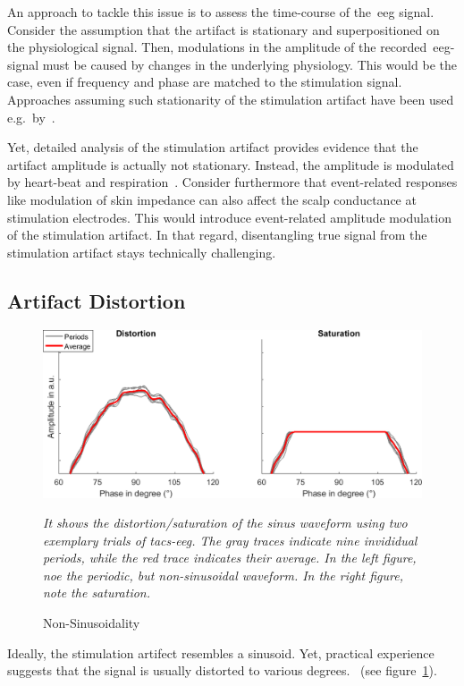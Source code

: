 \documentclass[a4paper]{article}
\newcommand{\figleg}[1]{\centering\itshape{#1}\/}
\newcommand{\figref}[1]{ (see figure~\ref{#1})}
\begin{document}
An approach to tackle this issue is to assess the time-course of the~\gls{eeg} signal. Consider the assumption that the artifact is stationary and superpositioned on the physiological signal. Then, modulations in the amplitude of the recorded~\gls{eeg}-signal must be caused by changes in the underlying physiology.
This would be the case, even if frequency and phase are matched to the stimulation signal. Approaches assuming such stationarity of the stimulation artifact have been used e.g.\ by~\cite{Pogosyan_2009}.

Yet, detailed analysis of the stimulation artifact provides evidence that the artifact amplitude is actually not stationary. Instead, the amplitude is modulated by heart-beat and respiration~\citep{Noury_2016}.
Consider furthermore that event-related responses like modulation of skin impedance can also affect the scalp conductance at stimulation electrodes. This would introduce event-related amplitude modulation of the stimulation artifact. In that regard, disentangling true signal from the stimulation artifact stays technically challenging.

\subsection{Artifact Distortion}
\begin{figure}
    \includegraphics[width=\textwidth]{./img/non_sinusoidality.png}
    \caption{Non-Sinusoidality}
    \figleg{It shows the distortion/saturation of the sinus waveform using two exemplary trials of \gls{tacs}-\gls{eeg}. The gray traces indicate nine invididual periods, while the red trace indicates their average. In the left figure, noe the periodic, but non-sinusoidal waveform. In the right figure, note the saturation.}\label{fig:nonsinus}
\end{figure}

Ideally, the stimulation artifect resembles a sinusoid. Yet, practical experience suggests that the signal is usually distorted to various degrees.~\figref{fig:nonsinus}.
\end{document}
